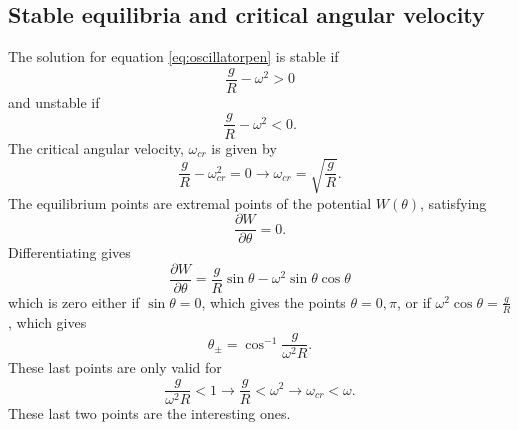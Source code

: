 \documentclass[11pt]{amsart}
\begin{document}
\subsection{Stable equilibria and critical angular velocity}
The solution for equation \ref{eq:oscillatorpen} is stable if
\begin{equation*}
\frac{g}{R}-\omega^2 > 0
\end{equation*}
and unstable if
\begin{equation*}
\frac{g}{R}-\omega^2 < 0.
\end{equation*}
The critical angular velocity, $\omega_{cr}$ is given by
\begin{equation}
\frac{g}{R}-\omega_{cr}^2 = 0 \rightarrow \omega_{cr} = \sqrt{\frac{g}{R}}.
\end{equation}
The equilibrium points are extremal points of the potential $W(\theta)$, satisfying
\begin{equation*}
\frac{\partial W}{\partial \theta} = 0.
\end{equation*}
Differentiating gives
\begin{equation}
\frac{\partial W}{\partial \theta} = \frac{g}{R}\sin\theta - \omega^2\sin\theta\cos\theta
\end{equation}
which is zero either if $\sin\theta = 0$, which gives the points $\theta = 0,\pi$, or if $\omega^2\cos\theta = \frac{g}{R}$, which gives 
\begin{equation}
\label{eq:thetapm}
\theta_\pm = \cos^{-1}\frac{g}{\omega^2R}. 
\end{equation}
These last points are only valid for
\begin{equation*}
\frac{g}{\omega^2R} < 1 \rightarrow \frac{g}{R} < \omega^2 \rightarrow \omega_{cr} < \omega. 
\end{equation*}
These last two points are the interesting ones.
\end{document}
